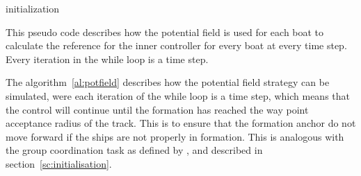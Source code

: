 \begin{algorithm}[H]
	initialization\;
	\caption{This pseudo code describes how the potential field is used
	for each boat to calculate the reference for the inner controller
	for every boat at every time step. Every iteration in the while loop
	is a time step.\vspace{6pt}}
	\label{al:potfield}
\end{algorithm}

The algorithm~\vref{al:potfield} describes how the potential field
strategy can be simulated, were each iteration of the while loop is a
time step, which means that the control will continue until the
formation has reached the way point acceptance radius of the track.
This is to ensure that the formation anchor do not move forward if the
ships are not properly in formation. This is analogous with the group
coordination task as defined by \citep{thorvaldsen}, and described in
section~\ref{sc:initialisation}.

